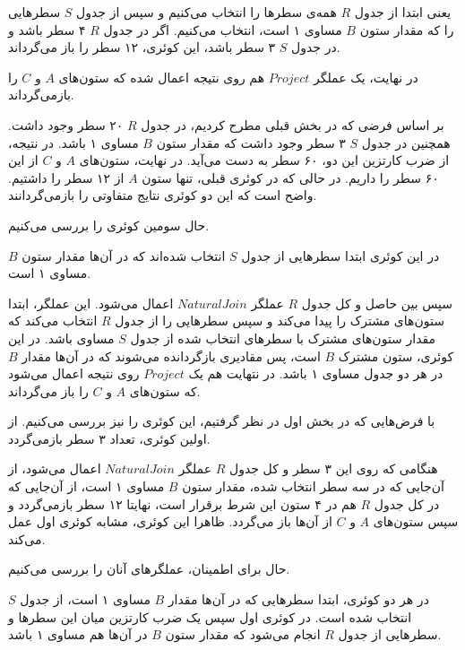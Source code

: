 \begin{LTRbibitems}\end{LTRbibitems}

\begin{LTRbibitems}\end{LTRbibitems}

یعنی ابتدا از جدول
$R$
همه‌ی سطرها را انتخاب می‌کنیم و سپس از جدول
$S$
سطرهایی را که مقدار ستون
$B$
مساوی ۱ است، انتخاب می‌کنیم.
اگر در جدول
$R$
۴ سطر باشد و در جدول
$S$
۳ سطر باشد، این کوئری، ۱۲ سطر را باز می‌گرداند.

در نهایت، یک  عملگر
$Project$
هم روی نتیجه اعمال شده که ستون‌های
$A$
و
$C$
را بازمی‌گرداند.

بر اساس فرضی که در بخش قبلی مطرح کردیم،‌ در جدول
$R$
۲۰ سطر وجود داشت.
همچنین در جدول
$S$
۳ سطر وجود داشت که مقدار ستون
$B$
مساوی ۱ باشد.
در نتیجه، از ضرب کارتزین این دو، ۶۰ سطر به دست می‌آید.
در نهایت، ستون‌های   
$A$
و
$C$
از این ۶۰ سطر را داریم.
در حالی که در کوئری قبلی، تنها ستون 
$A$
از ۱۲ سطر را داشتیم.
واضح است که این دو کوئری نتایج متفاوتی را بازمی‌گردانند.


حال سومین کوئری را بررسی می‌کنیم.


در این کوئری ابتدا سطرهایی از جدول
$S$
انتخاب شده‌اند که در آن‌ها مقدار ستون
$B$
مساوی ۱ است.


سپس بین حاصل و کل جدول
$R$
عملگر
$Natural Join$
اعمال می‌شود.
این عملگر، ابتدا ستون‌های مشترک را پیدا می‌کند و سپس سطرهایی را از جدول
$R$
انتخاب می‌کند که مقدار ستون‌های مشترک با سطرهای انتخاب شده از جدول
$S$
مساوی باشد.
در این کوئری، ستون مشترک
$B$
است، پس مقادیری بازگردانده می‌شوند که در آن‌ها مقدار
$B$
در هر دو جدول مساوی ۱ باشد.
در نتهایت هم یک 
$Project$
روی نتیجه اعمال می‌شود که ستون‌های
$A$
و
$C$
را باز می‌گرداند.

با فرض‌هایی که در بخش اول در نظر گرفتیم، این کوئری را نیز بررسی می‌کنیم.
از اولین کوئری، تعداد ۳ سطر بازمی‌گردد.

هنگامی که روی این ۳ سطر و کل جدول
$R$
عملگر 
$Natural Join$
اعمال می‌شود، از آن‌جایی که در سه سطر انتخاب شده، مقدار ستون
$B$
مساوی ۱ است، از آن‌جایی که در کل جدول
$R$
هم  در ۴ ستون این شرط برقرار است، نهایتا ۱۲ سطر بازمی‌گردد و سپس ستون‌های
$A$
و
$C$
از آن‌ها باز می‌گردد.
ظاهرا این کوئری، مشابه کوئری اول عمل می‌کند.

حال برای اطمینان، عملگرهای آنان را بررسی می‌کنیم.

در هر دو کوئری، ابتدا سطرهایی که در آن‌ها مقدار
$B$
مساوی ۱ است، از جدول
$S$
انتخاب شده است.
در کوئری اول سپس یک ضرب کارتزین میان این سطرها و سطرهایی از جدول
$R$
انجام می‌شود که مقدار ستون
$B$
در آن‌ها هم مساوی ۱ باشد.

